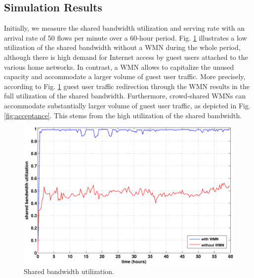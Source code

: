 \subsection{Simulation Results}
\label{evaluation:results}

Initially, we measure the shared bandwidth utilization and serving rate with an arrival rate of 50 flows per minute over a 60-hour period. Fig. \ref{fig:utilization} illustrates a low utilization of the shared bandwidth without a WMN during the whole period, although there is high demand for Internet access by guest users attached to the various home networks. In contrast, a WMN allows to capitalize the unused capacity and accommodate a larger volume of guest user traffic. More precisely, according to Fig. \ref{fig:utilization} guest user traffic redirection through the WMN results in the full utilization of the shared bandwidth. Furthermore, crowd-shared WMNs can accommodate substantially larger volume of guest user traffic, as depicted in Fig. \ref{fig:acceptance}. This stems from the high utilization of the shared bandwidth.

\begin{figure}[t]
\begin{center}
\includegraphics[width=1\linewidth]{results/utilization.pdf}
\caption{Shared bandwidth utilization.}
\label{fig:utilization}
\end{center}
\end{figure}

